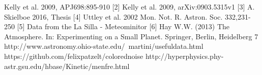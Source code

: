 \documentclass[a4paper, 12pt, twoside]{article}
\begin{document}
\newpage
[1] Kelly et al. 2009, APJ698:895-910 
[2] Kelly et al. 2009, arXiv:0903.5315v1 
[3] A. Skielboe 2016, Thesis 
[4] Uttley et al. 2002 Mon. Not. R. Astron. Soc. 332,231-250
[5] Data from the La Silla - Meteominitor
[6] Hay W.W. (2013) The Atmosphere. In: Experimenting on a Small Planet. Springer, Berlin, Heidelberg
{7} http://www.astronomy.ohio-state.edu/~martini/usefuldata.html
https://github.com/felixpatzelt/colorednoise
http://hyperphysics.phy-astr.gsu.edu/hbase/Kinetic/menfre.html

\end{document}
